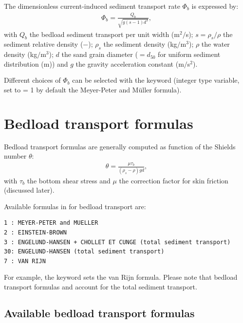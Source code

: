 The dimensionless current-induced sediment transport rate $\Phi_b$ is expressed by:
\begin{align}
\Phi_b = \frac{Q_b}{\sqrt{g(s-1)d^3}},
\label{eq:Phis}
\end{align}
with $Q_b$ the bedload sediment transport per unit width (m$^2/$s); $s=\rho_s/\rho$ the sediment relative density ($-$); $\rho_s$ the sediment density (kg$/$m$^3$); $\rho$ the water density (kg$/$m$^3$); $d$ the sand grain diameter ($=d_{50}$ for uniform sediment distribution (m)) and $g$ the gravity acceleration constant (m$/$s$^2$).

Different choices of $\Phi_b$ can be selected with the keyword  (integer type variable, set to {\ttfamily = 1} by default the Meyer-Peter and M\"uller formula).

\section{Bedload transport formulas}
Bedload transport formulas are generally computed as function of the Shields number $\theta$:
\begin{align}
\theta=\frac{\mu\tau_b}{(\rho_s-\rho)gd}, 
\label{eq:shieldsp}
\end{align}
with $\tau_b$ the bottom shear stress and $\mu$ the correction factor for skin friction (discussed later).

Available formulas in \sisyphe{} for bedload transport are:
\begin{lstlisting}[frame=trBL]
1 : MEYER-PETER and MUELLER
2 : EINSTEIN-BROWN 
3 : ENGELUND-HANSEN + CHOLLET ET CUNGE (total sediment transport)
30: ENGELUND-HANSEN (total sediment transport)
7 : VAN RIJN 
\end{lstlisting}
For example, the keyword  sets the van Rijn formula. Please note that bedload transport formulas  and  account for the total sediment transport.

\subsection{Available bedload transport formulas}

